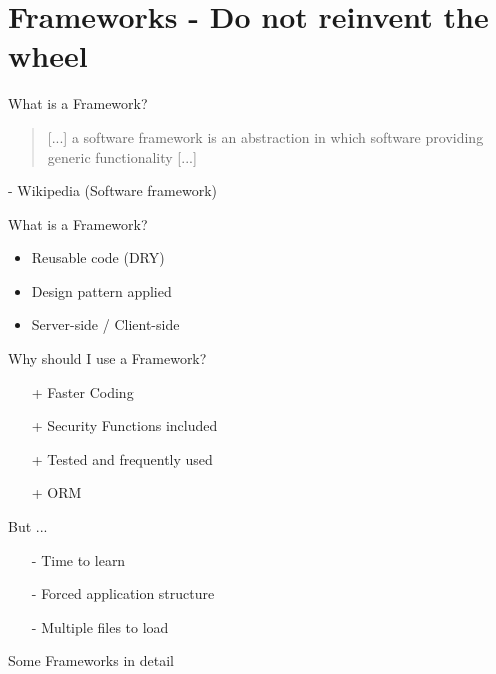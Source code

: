 \section{Frameworks - Do not reinvent the wheel}
\begin{frame}{What is a Framework?}
	\begin{quote}
		[...] a software framework is an abstraction in which software providing generic functionality [...]
	\end{quote}
	- Wikipedia (Software framework)
\end{frame}

\begin{frame}{What is a Framework?}
	\begin{itemize}
		\item Reusable code (DRY)
		\item Design pattern applied
		\item Server-side / Client-side %
	\end{itemize}
\end{frame}

\begin{frame}{Why should I use a Framework?}
	\begin{itemize}
		\item[+] Faster Coding
		\item[+] Security Functions included
		\item[+] Tested and frequently used
		\item[+] ORM
	\end{itemize}
\end{frame}

\begin{frame}{But ...}
	\begin{itemize}
		\item[-] Time to learn
		\item[-] Forced application structure
		\item[-] Multiple files to load
	\end{itemize}
\end{frame}

\begin{frame}{Some Frameworks in detail}
\end{frame}


